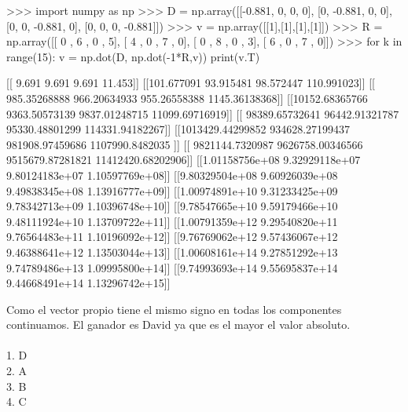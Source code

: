 \documentclass{article}
\begin{document}
\begin{python}
>>> import numpy as np
>>> D = np.array([[-0.881, 0, 0, 0], [0, -0.881, 0, 0], [0, 0, -0.881, 0], [0, 0, 0, -0.881]])
>>> v = np.array([[1],[1],[1],[1]])
>>> R = np.array([[ 0 , 6 , 0 , 5], [ 4 , 0 , 7 , 0], [ 0 , 8 , 0 , 3], [ 6 , 0 , 7 , 0]])
>>> for k in range(15):
        v = np.dot(D, np.dot(-1*R,v))
        print(v.T)

        
[[ 9.691  9.691  9.691 11.453]]
[[101.677091  93.915481  98.572447 110.991023]]
[[ 985.35268888  966.20634933  955.26558388 1145.36138368]]
[[10152.68365766  9363.50573139  9837.01248715 11099.69716919]]
[[ 98389.65732641  96442.91321787  95330.48801299 114331.94182267]]
[[1013429.44299852  934628.27199437  981908.97459686 1107990.8482035 ]]
[[ 9821144.7320987   9626758.00346566  9515679.87281821 11412420.68202906]]
[[1.01158756e+08 9.32929118e+07 9.80124183e+07 1.10597769e+08]]
[[9.80329504e+08 9.60926039e+08 9.49838345e+08 1.13916777e+09]]
[[1.00974891e+10 9.31233425e+09 9.78342713e+09 1.10396748e+10]]
[[9.78547665e+10 9.59179466e+10 9.48111924e+10 1.13709722e+11]]
[[1.00791359e+12 9.29540820e+11 9.76564483e+11 1.10196092e+12]]
[[9.76769062e+12 9.57436067e+12 9.46388641e+12 1.13503044e+13]]
[[1.00608161e+14 9.27851292e+13 9.74789486e+13 1.09995800e+14]]
[[9.74993693e+14 9.55695837e+14 9.44668491e+14 1.13296742e+15]]
\end{python}
Como el vector propio tiene el mismo signo en todas los componentes continuamos. El ganador es David ya que es el mayor el valor absoluto.
\\\\
1. D\\
2. A\\
3. B\\
4. C
\end{document}
